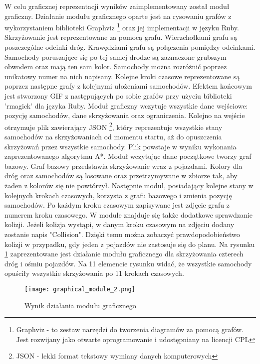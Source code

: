 W celu graficznej reprezentacji wyników zaimplementowany został moduł graficzny. Działanie modułu graficznego oparte jest na rysowaniu grafów z wykorzystaniem biblioteki Graphviz \footnote{Graphviz - to zestaw narzędzi do tworzenia diagramów za pomocą grafów. Jest rozwijany jako otwarte oprogramowanie i udostępniany na licencji CPL} oraz jej implementacji w języku Ruby. Skrzyżowanie jest reprezentowane za pomocą grafu. Wierzchołkami grafu są poszczególne odcinki dróg. Krawędziami grafu są połączenia pomiędzy odcinkami. Samochody poruszające się po tej samej drodze są zaznaczone grubszym obwodem oraz mają ten sam kolor. Samochody można rozróżnić poprzez unikatowy numer na nich napisany. Kolejne kroki czasowe reprezentowane są poprzez następne grafy z kolejnymi ułożeniami samochodów. Efektem końcowym jest stworzony GIF z następujących po sobie grafów przy użyciu biblioteki 'rmagick' dla języka Ruby.
\newline
\indent
Moduł graficzny wczytuje wszystkie dane wejściowe: pozycję samochodów, dane skrzyżowania oraz ograniczenia. Kolejno na wejście otrzymuje plik zawierający JSON \footnote{JSON - lekki format tekstowy wymiany danych komputerowych}, który reprezentuje wszystkie stany samochodów na skrzyżowaniach od momentu startu, aż do opuszczenia skrzyżowań przez wszystkie samochody. Plik powstaje w wyniku wykonania zaprezentowanego algorytmu A*. Moduł wczytując dane początkowe tworzy graf bazowy. Graf bazowy przedstawia skrzyżowanie wraz z pojazdami. Kolory dla dróg oraz samochodów są losowane oraz przetrzymywane w zbiorze tak, aby żaden z kolorów się nie powtórzył. Następnie moduł, posiadający kolejne stany w kolejnych krokach czasowych, korzysta z grafu bazowego i zmienia pozycję samochodów. Po każdym kroku czasowym zapisywane jest zdjęcie grafu z numerem kroku czasowego.
\newline
\indent
W module znajduje się także dodatkowe sprawdzanie kolizji. Jeżeli kolizja wystąpi, w danym kroku czasowym na zdjęciu dodany zostanie napis "Collision". Dzięki temu można zobaczyć prawdopodobieństwo kolizji w przypadku, gdy jeden z pojazdów nie zastosuje się do planu.
\newline
\indent
Na rysunku \ref{graphical-framework} zaprezentowane jest działanie modułu graficznego dla skrzyżowania czterech dróg i ośmiu pojazdów. Na 11 elemencie rysunku widać, że wszystkie samochody opuściły wszystkie skrzyżowania po 11 krokach czasowych.
\begin{figure}[H]
    \texttt{[image: graphical\_module\_2.png]}
  \caption{Wynik działania modułu graficznego}
  \label{graphical-framework}
\end{figure}
\newpage

